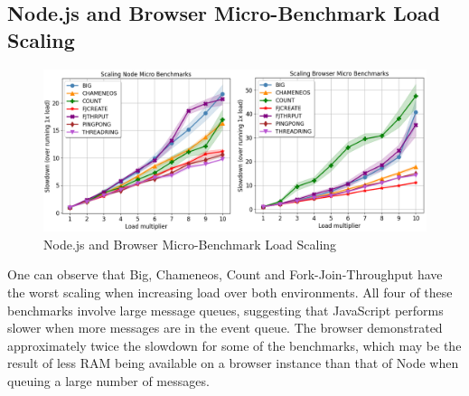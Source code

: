 \documentclass[oneside]{um-fict}
\begin{document}
\subsection{Node.js and Browser Micro-Benchmark Load Scaling}
\begin{figure}[H]
    \begin{centering}
        \includegraphics[width=\textwidth]{resources/load_scaling.png}
        \caption{Node.js and Browser Micro-Benchmark Load Scaling}\label{fig:load_scaling}
    \end{centering}
\end{figure}
One can observe that Big, Chameneos, Count and Fork-Join-Throughput have the worst scaling when increasing load over both environments. All four of these benchmarks involve large message queues, suggesting that JavaScript performs slower when more messages are in the event queue. The browser demonstrated approximately twice the slowdown for some of the benchmarks, which may be the result of less RAM being available on a browser instance than that of Node when queuing a large number of messages.
\end{document}
